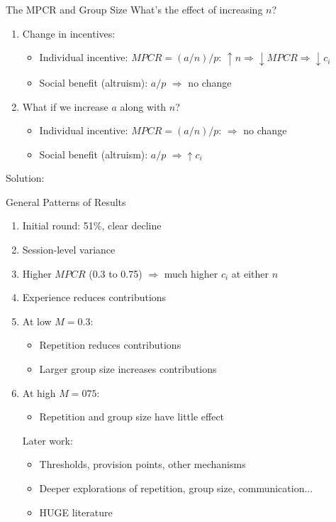 \begin{frame}{The MPCR and Group Size}
What's the effect of increasing $n$?
\begin{enumerate}
    \item Change in incentives:
    \begin{itemize}
        \item Individual incentive: $MPCR = (a/n)/p$: $\uparrow n \Rightarrow \downarrow MPCR \Rightarrow \downarrow c_i$
        \item Social benefit (altruism): $a/p$ $\Rightarrow$ no change
    \end{itemize}
    \item What if we increase $a$ along with $n$?
    \begin{itemize}
        \item Individual incentive: $MPCR = (a/n)/p$: $\Rightarrow$ no change
        \item Social benefit (altruism): $a/p$ $\Rightarrow \uparrow c_i$
    \end{itemize}
\end{enumerate}
Solution: 
\end{frame}

\begin{frame}{General Patterns of Results} 
\begin{enumerate}
    \item Initial round: 51\%, clear decline
    \item Session-level variance
    \item Higher $MPCR$ (0.3 to 0.75) $\Rightarrow$ much higher $c_i$ at either $n$
    \item Experience reduces contributions
    \item At low $M=0.3$:
    \begin{itemize}
        \item Repetition reduces contributions
        \item Larger group size increases contributions
    \end{itemize}
    \item At high $M=075$:
    \begin{itemize}
        \item Repetition and group size have little effect
    \end{itemize}
\br
Later work:
\begin{itemize}
    \item Thresholds, provision points, other mechanisms
    \item Deeper explorations of repetition, group size, communication...
    \item HUGE literature
\end{itemize}
\end{enumerate}
\end{frame}

